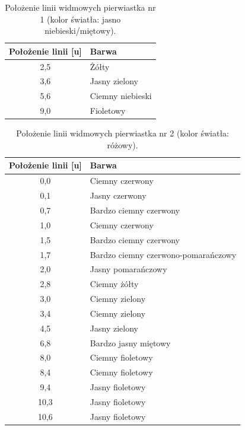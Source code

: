 \documentclass[a4paper,12pt]{article}
\begin{document}
\begin{table}[H]
    \centering
    \begin{tabular}{|c|l|}
        \hline
        Położenie linii [u] & Barwa \\ \hline
        2{,}5 & Żółty \\ \hline
        3{,}6 & Jasny zielony \\ \hline
        5{,}6 & Ciemny niebieski \\ \hline
        9{,}0 & Fioletowy \\ \hline
    \end{tabular}
    \caption{Położenie linii widmowych pierwiastka nr 1 (kolor światła: jasno niebieski/miętowy).}
\end{table}

\begin{table}[H]
    \centering
    \begin{tabular}{|c|l|}
        \hline
        Położenie linii [u] & Barwa \\ \hline
        0{,}0 & Ciemny czerwony \\ \hline
        0{,}1 & Jasny czerwony \\ \hline
        0{,}7 & Bardzo ciemny czerwony \\ \hline
        1{,}0 & Ciemny czerwony \\ \hline
        1{,}5 & Bardzo ciemny czerwony \\ \hline
        1{,}7 & Bardzo ciemny czerwono-pomarańczowy \\ \hline
        2{,}0 & Jasny pomarańczowy \\ \hline
        2{,}8 & Ciemny żółty \\ \hline
        3{,}0 & Ciemny zielony \\ \hline
        3{,}4 & Ciemny zielony \\ \hline
        4{,}5 & Jasny zielony \\ \hline
        6{,}8 & Bardzo jasny miętowy \\ \hline
        8{,}0 & Ciemny fioletowy \\ \hline
        8{,}4 & Ciemny fioletowy \\ \hline
        9{,}4 & Jasny fioletowy \\ \hline
        10{,}3 & Jasny fioletowy \\ \hline
        10{,}6 & Jasny fioletowy \\ \hline
    \end{tabular}
    \caption{Położenie linii widmowych pierwiastka nr 2 (kolor światła: różowy).}
\end{table}
\end{document}
